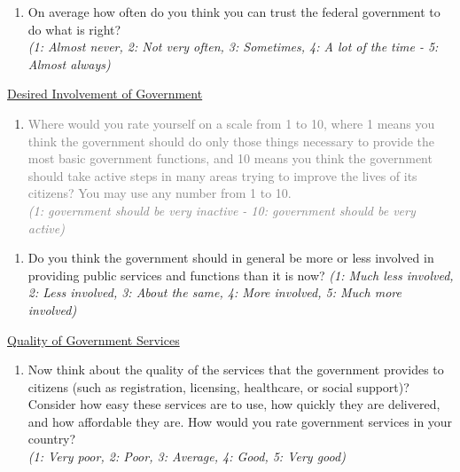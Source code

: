\documentclass[11pt]{article}
\begin{document}
\begin{enumerate}[resume]
    \item On average how often do you think you can trust the federal government to do what is right? \\ \textit{(1: Almost never, 2: Not very often, 3: Sometimes, 4: A lot of the time - 5: Almost always)} 
\end{enumerate}
\underline{Desired Involvement of Government}
\begin{enumerate}[resume]
    \item[\sout{\theenumi.}] \textcolor{gray}{Where would you rate yourself on a scale from 1 to 10, where 1 means you think the government should do only those things necessary to provide the most basic government functions, and 10 means you think the government should take active steps in many areas trying to improve the lives of its citizens? You may use any number from 1 to 10. \\\textit{(1: government should be very inactive - 10: government should be very active)}}
\end{enumerate}
\begin{enumerate}[resume]
    \item Do you think the government should in general be more or less involved in providing public services and functions than it is now?
    \textit{(1: Much less involved, 2: Less involved, 3: About the same, 4: More involved, 5: Much more involved)}

\end{enumerate}
\underline{Quality of Government Services}
\begin{enumerate}[resume]
    \item Now think about the quality of the services that the government provides to citizens (such as registration, licensing, healthcare, or social support)? Consider how easy these services are to use, how quickly they are delivered, and how affordable they are. How would you rate government services in your country? \\
    \textit{(1: Very poor, 2: Poor, 3: Average, 4: Good, 5: Very good)}
\end{enumerate}
\end{document}
